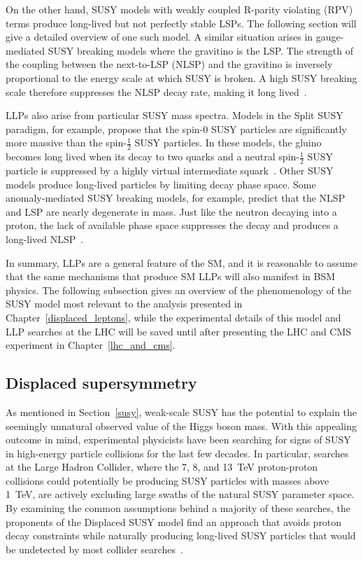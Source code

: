On the other hand, SUSY models with weakly coupled R-parity violating (RPV) terms produce long-lived but not perfectly stable LSPs. The following section will give a detailed overview of one such model. A similar situation arises in gauge-mediated SUSY breaking models where the gravitino is the LSP. The strength of the coupling between the next-to-LSP (NLSP) and the gravitino is inversely proportional to the energy scale at which SUSY is broken. A high SUSY breaking scale therefore suppresses the NLSP decay rate, making it long lived~\cite{liu_2015}.

LLPs also arise from particular SUSY mass spectra. Models in the Split SUSY paradigm, for example, propose that the spin-0 SUSY particles are significantly more massive than the spin-$\frac{1}{2}$ SUSY particles. In these models, the gluino becomes long lived when its decay to two quarks and a neutral spin-$\frac{1}{2}$ SUSY particle is suppressed by a highly virtual intermediate squark~\cite{split_susy_colliders}. Other SUSY models produce long-lived particles by limiting decay phase space. Some anomaly-mediated SUSY breaking models, for example, predict that the NLSP and LSP are nearly degenerate in mass. Just like the neutron decaying into a proton, the lack of available phase space suppresses the decay and produces a long-lived NLSP~\cite{amsb_at_lhc}.

In summary, LLPs are a general feature of the SM, and it is reasonable to assume that the same mechanisms that produce SM LLPs will also manifest in BSM physics. The following subsection gives an overview of the phenomenology of the SUSY model most relevant to the analysis presented in Chapter~\ref{displaced_leptons}, while the experimental details of this model and LLP searches at the LHC will be saved until after presenting the LHC and CMS experiment in Chapter~\ref{lhc_and_cms}.

\subsection{Displaced supersymmetry}
\label{displaced_susy}
As mentioned in Section~\ref{susy}, weak-scale SUSY has the potential to explain the seemingly unnatural observed value of the Higgs boson mass. With this appealing outcome in mind, experimental physicists have been searching for signs of SUSY in high-energy particle collisions for the last few decades. In particular, searches at the Large Hadron Collider, where the \num{7}, \num{8}, and \SI{13}{\TeV} proton-proton collisions could potentially be producing SUSY particles with masses above \SI{1}{\TeV}, are actively excluding large swaths of the natural SUSY parameter space. By examining the common assumptions behind a majority of these searches, the proponents of the Displaced SUSY model find an approach that avoids proton decay constraints while naturally producing long-lived SUSY particles that would be undetected by most collider searches~\cite{displaced_susy}.

